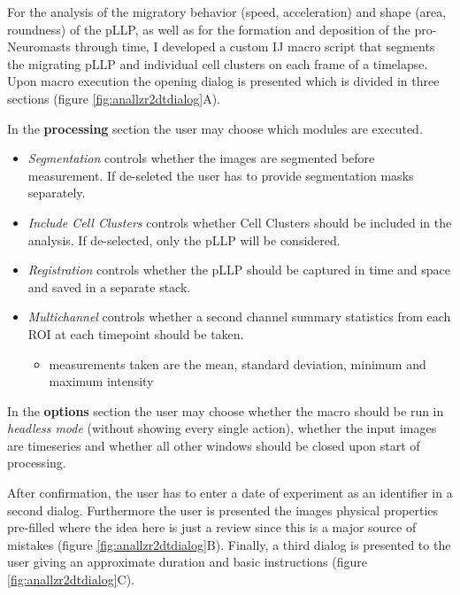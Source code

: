 \documentclass[11pt,singlespacinge,twoside]{reedthesis} %
\providecommand{\tightlist}{%
  \setlength{\itemsep}{0pt}\setlength{\parskip}{0pt}}
\theoremstyle{definition}
\theoremstyle{definition}
\theoremstyle{definition}
\theoremstyle{remark}
\begin{document}
For the analysis of the migratory behavior (speed, acceleration) and shape (area, roundness) of the pLLP, as well as for the formation and deposition of the pro-Neuromasts through time, I developed a custom IJ macro script that segments the migrating pLLP and individual cell clusters on each frame of a timelapse. Upon macro execution the opening dialog is presented which is divided in three sections (figure \ref{fig:anallzr2dtdialog}A).

In the \textbf{processing} section the user may choose which modules are executed.
\begin{itemize}
\tightlist
\item
  \emph{Segmentation} controls whether the images are segmented before measurement. If de-seleted the user has to provide segmentation masks separately.
\item
  \emph{Include Cell Clusters} controls whether Cell Clusters should be included in the analysis. If de-selected, only the pLLP will be considered.
\item
  \emph{Registration} controls whether the pLLP should be captured in time and space and saved in a separate stack.
\item
  \emph{Multichannel} controls whether a second channel summary statistics from each ROI at each timepoint should be taken.
  \begin{itemize}
  \tightlist
  \item
    measurements taken are the mean, standard deviation, minimum and maximum intensity
  \end{itemize}
\end{itemize}
In the \textbf{options} section the user may choose whether the macro should be run in \emph{headless mode} (without showing every single action), whether the input images are timeseries and whether all other windows should be closed upon start of processing.

After confirmation, the user has to enter a date of experiment as an identifier in a second dialog. Furthermore the user is presented the images physical properties pre-filled where the idea here is just a review since this is a major source of mistakes (figure \ref{fig:anallzr2dtdialog}B). Finally, a third dialog is presented to the user giving an approximate duration and basic instructions (figure \ref{fig:anallzr2dtdialog}C).
\end{document}
